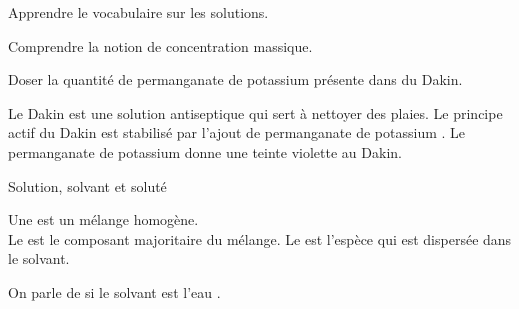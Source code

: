 \newpage
{}


\vspace*{-36pt}


\begin{objectifs}
  \item Apprendre le vocabulaire sur les solutions.
  \item Comprendre la notion de concentration massique.
  \item Doser la quantité de permanganate de potassium présente dans du Dakin.
\end{objectifs}


\begin{encart}
  
  Le Dakin est une solution antiseptique qui sert à nettoyer des plaies. Le principe actif du Dakin est stabilisé par l'ajout de permanganate de potassium .
  Le permanganate de potassium donne une teinte violette au Dakin.
\end{encart}



\begin{doc}{Solution, solvant et soluté}
  \label{doc:solution}
  \vspace*{-24pt}
  \begin{encart}
    \chevron Une  est un mélange homogène. \\
    Le  est le composant majoritaire du mélange. Le  est l'espèce qui est dispersée dans le solvant.
  \end{encart}
  
  \begin{center}
  \end{center}
  
  \begin{encart}
    On parle de  si le solvant est l'eau .
  \end{encart}
\end{doc}


